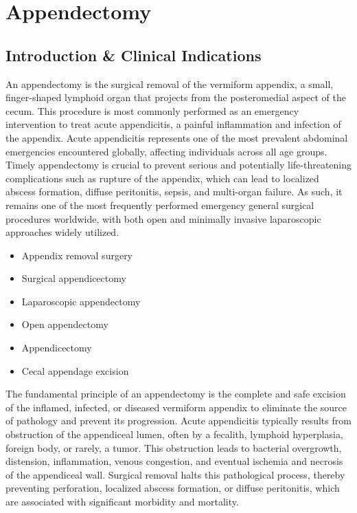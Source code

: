 \chapter{Appendectomy}

\section*{Introduction \& Clinical Indications}
An appendectomy is the surgical removal of the vermiform appendix, a small, finger-shaped lymphoid organ that projects from the posteromedial aspect of the cecum. This procedure is most commonly performed as an emergency intervention to treat acute appendicitis, a painful inflammation and infection of the appendix. Acute appendicitis represents one of the most prevalent abdominal emergencies encountered globally, affecting individuals across all age groups. Timely appendectomy is crucial to prevent serious and potentially life-threatening complications such as rupture of the appendix, which can lead to localized abscess formation, diffuse peritonitis, sepsis, and multi-organ failure. As such, it remains one of the most frequently performed emergency general surgical procedures worldwide, with both open and minimally invasive laparoscopic approaches widely utilized.

\begin{itemize}
  \item Appendix removal surgery
  \item Surgical appendicectomy
  \item Laparoscopic appendectomy
  \item Open appendectomy
  \item Appendicectomy
  \item Cecal appendage excision
\end{itemize}

The fundamental principle of an appendectomy is the complete and safe excision of the inflamed, infected, or diseased vermiform appendix to eliminate the source of pathology and prevent its progression. Acute appendicitis typically results from obstruction of the appendiceal lumen, often by a fecalith, lymphoid hyperplasia, foreign body, or rarely, a tumor. This obstruction leads to bacterial overgrowth, distension, inflammation, venous congestion, and eventual ischemia and necrosis of the appendiceal wall. Surgical removal halts this pathological process, thereby preventing perforation, localized abscess formation, or diffuse peritonitis, which are associated with significant morbidity and mortality.

